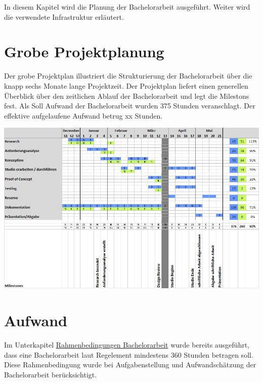 In diesem Kapitel wird die Planung der Bachelorarbeit ausgeführt. Weiter
wird die verwendete Infrastruktur erläutert.

\section{Grobe Projektplanung}\label{grobe-projektplanung}

Der grobe Projektplan illustriert die Strukturierung der Bachelorarbeit
über die knapp sechs Monate lange Projektzeit. Der Projektplan liefert
einen generellen Überblick über den zeitlichen Ablauf der Bachelorarbeit
und legt die Milestons fest. Als Soll Aufwand der Bachelorarbeit wurden
375 Stunden veranschlagt. Der effektive aufgelaufene Aufwand betrug xx
Stunden.

\includegraphics{images/projektplan.jpg}

\newpage

\section{Aufwand}\label{aufwand}

Im Unterkapitel
\protect\hyperlink{rahmenbedingungen-bachelorarbeit}{Rahmenbedingungen
Bachelorarbeit} wurde bereits ausgeführt, dass eine Bachelorarbeit laut
Regelement mindestens 360 Stunden betragen soll. Diese Rahmenbedingung
wurde bei Aufgabenstellung und Aufwandschätzung der Bachelorarbeit
berücksichtigt.

